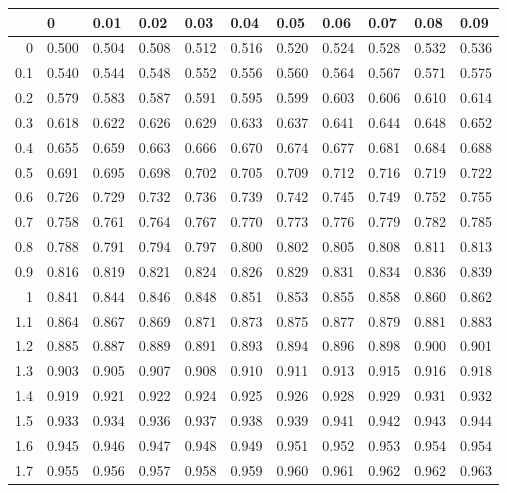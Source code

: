 \documentclass[11pt]{book}\usepackage[]{graphicx}\usepackage[]{color}
\begin{document}
\begin{table}[ht]
\centering
\begin{tabular}{rllllllllll}
  \hline
 & 0 & 0.01 & 0.02 & 0.03 & 0.04 & 0.05 & 0.06 & 0.07 & 0.08 & 0.09 \\ 
  \hline
0 & 0.500 & 0.504 & 0.508 & 0.512 & 0.516 & 0.520 & 0.524 & 0.528 & 0.532 & 0.536 \\ 
  0.1 & 0.540 & 0.544 & 0.548 & 0.552 & 0.556 & 0.560 & 0.564 & 0.567 & 0.571 & 0.575 \\ 
  0.2 & 0.579 & 0.583 & 0.587 & 0.591 & 0.595 & 0.599 & 0.603 & 0.606 & 0.610 & 0.614 \\ 
  0.3 & 0.618 & 0.622 & 0.626 & 0.629 & 0.633 & 0.637 & 0.641 & 0.644 & 0.648 & 0.652 \\ 
  0.4 & 0.655 & 0.659 & 0.663 & 0.666 & 0.670 & 0.674 & 0.677 & 0.681 & 0.684 & 0.688 \\ 
  0.5 & 0.691 & 0.695 & 0.698 & 0.702 & 0.705 & 0.709 & 0.712 & 0.716 & 0.719 & 0.722 \\ 
  0.6 & 0.726 & 0.729 & 0.732 & 0.736 & 0.739 & 0.742 & 0.745 & 0.749 & 0.752 & 0.755 \\ 
  0.7 & 0.758 & 0.761 & 0.764 & 0.767 & 0.770 & 0.773 & 0.776 & 0.779 & 0.782 & 0.785 \\ 
  0.8 & 0.788 & 0.791 & 0.794 & 0.797 & 0.800 & 0.802 & 0.805 & 0.808 & 0.811 & 0.813 \\ 
  0.9 & 0.816 & 0.819 & 0.821 & 0.824 & 0.826 & 0.829 & 0.831 & 0.834 & 0.836 & 0.839 \\ 
  1 & 0.841 & 0.844 & 0.846 & 0.848 & 0.851 & 0.853 & 0.855 & 0.858 & 0.860 & 0.862 \\ 
  1.1 & 0.864 & 0.867 & 0.869 & 0.871 & 0.873 & 0.875 & 0.877 & 0.879 & 0.881 & 0.883 \\ 
  1.2 & 0.885 & 0.887 & 0.889 & 0.891 & 0.893 & 0.894 & 0.896 & 0.898 & 0.900 & 0.901 \\ 
  1.3 & 0.903 & 0.905 & 0.907 & 0.908 & 0.910 & 0.911 & 0.913 & 0.915 & 0.916 & 0.918 \\ 
  1.4 & 0.919 & 0.921 & 0.922 & 0.924 & 0.925 & 0.926 & 0.928 & 0.929 & 0.931 & 0.932 \\ 
  1.5 & 0.933 & 0.934 & 0.936 & 0.937 & 0.938 & 0.939 & 0.941 & 0.942 & 0.943 & 0.944 \\ 
  1.6 & 0.945 & 0.946 & 0.947 & 0.948 & 0.949 & 0.951 & 0.952 & 0.953 & 0.954 & 0.954 \\ 
  1.7 & 0.955 & 0.956 & 0.957 & 0.958 & 0.959 & 0.960 & 0.961 & 0.962 & 0.962 & 0.963 \\ 

\end{tabular}
\end{table}
\end{document}
